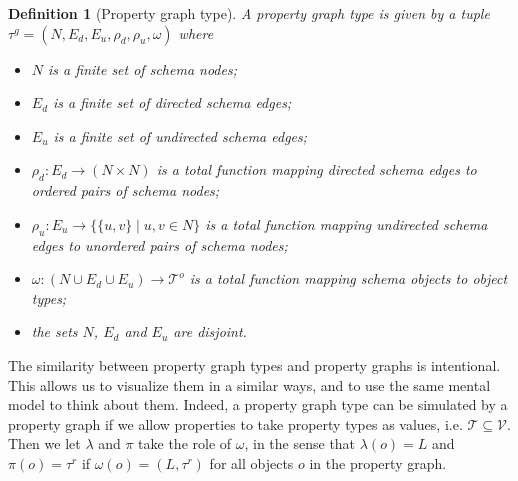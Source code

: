 \documentclass[a4paper]{article}
\newtheorem{definition}[theorem]{Definition}
\newcommand{\ptypes}{\mathcal{T}}
\newcommand{\rtype}{\tau^r}
\newcommand{\otypes}{\mathcal{T}^o}
\newcommand{\gtype}{\tau^g}
\begin{document}
\begin{definition}[Property graph type]
  A \emph{property graph type} is given by a tuple $\gtype = (N, E_d, E_u, \rho_d, \rho_u, \omega)$ where 
  \begin{itemize}
    \item $N$ is a finite set of schema nodes;
    \item $E_d$ is a finite set of directed schema edges;
    \item $E_u$ is a finite set of undirected schema edges;
    \item $\rho_d : E_d \to (N \times N)$ is a total function mapping directed schema edges to ordered pairs of schema nodes;
    \item $\rho_u : E_u \to \{\{u, v\} \mid u, v \in N\}$ is a total function mapping undirected schema edges to unordered pairs of schema nodes;
    \item $\omega : (N \cup E_d \cup E_u) \to \otypes$ is a total function mapping schema objects to object types;
    \item the sets $N$, $E_d$ and $E_u$ are disjoint.
  \end{itemize}
\end{definition}

The similarity between property graph types and property graphs is intentional. This allows us to visualize them in a similar ways, and to use the same mental model to think about them. Indeed, a property graph type can be simulated by a property graph if we allow properties to take property types as values, i.e. $\ptypes \subseteq \mathcal{V}$. Then we let $\lambda$ and $\pi$ take the role of $\omega$, in the sense that $\lambda(o) = L$ and $\pi(o) = \rtype$ if $\omega(o) = (L, \rtype)$ for all objects $o$ in the property graph.
\end{document}
